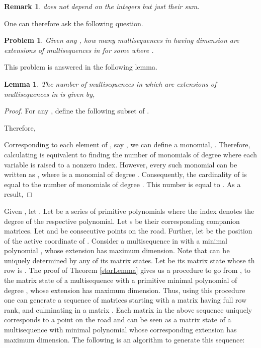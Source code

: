 \documentclass[letterpaper, 12 pt]{article}  \usepackage{amssymb}
\newtheorem{remark}[theorem]{Remark}
\newtheorem{lemma}[theorem]{Lemma}
\newtheorem{problem}{Problem}
\begin{document}
\begin{remark}
  does not depend on the integers  but just
their sum.
\end{remark}
One can therefore ask the following question.

\begin{problem}
 Given any , how many multisequences in  having dimension 
are extensions of multisequences in  for some  where . 
\end{problem}

This problem is answered in the following lemma.


\begin{lemma}
The number of multisequences in  which are extensions of
multisequences in  is given by,

\end{lemma}

\begin{proof}
 For any , define the following subset  of
. 


Therefore, 

Corresponding to each element of , say ,
we can define a monomial, . Therefore,
calculating   is equivalent to finding the number of monomials
of degree  where each variable 
is raised to a nonzero index. However, every such monomial can be written as
, where
 is a monomial of degree . Consequently, the
cardinality of 
 is equal to the number of monomials of degree . This
number is equal to . As a result, 

\end{proof}

Given , let .
Let  be a series of primitive polynomials where the
index  denotes the degree of the respective polynomial. Let s be
their corresponding companion matrices. Let  and  be consecutive
points on the road. Further, let  be the position of the active
coordinate of . Consider a multisequence  in  with a minimal
polynomial , whose extension has maximum dimension.
Note that  can be uniquely determined by any of its matrix states. Let 
be its matrix state whose th row is . The proof of
Theorem \ref{starLemma} gives us a procedure to go from , to the matrix
state  of a multisequence  with a primitive minimal polynomial
 of degree , whose extension has maximum dimension.
Thus, using this procedure one can generate a sequence of matrices
 starting with a matrix  having full row rank, and culminating in a matrix  . Each matrix  in the above sequence uniquely corresponds to a
point  on the road and can be seen as a matrix state of a multisequence
with minimal polynomial  whose corresponding extension has maximum
dimension. The following is an algorithm to generate this sequence: 
  
\end{document}
